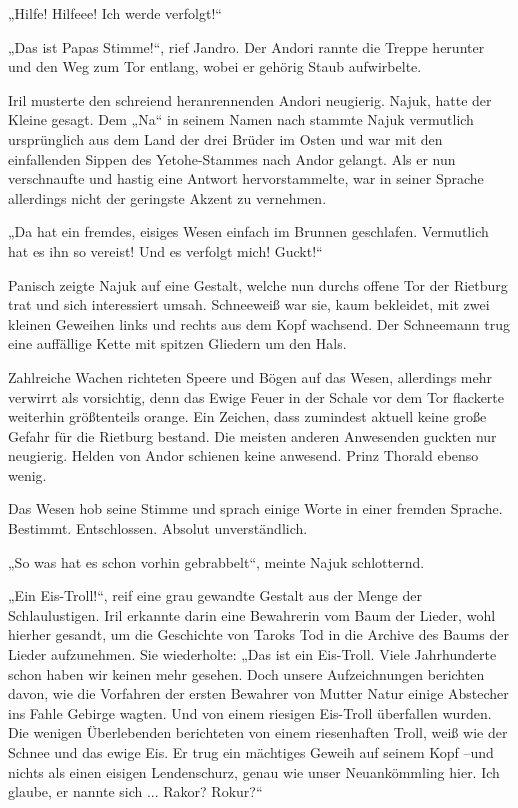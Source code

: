 „Hilfe! Hilfeee! Ich werde verfolgt!“

„Das ist Papas Stimme!“, rief Jandro. Der Andori rannte die Treppe herunter und den Weg zum Tor entlang, wobei er gehörig Staub aufwirbelte.

Iril musterte den schreiend heranrennenden Andori neugierig. Najuk, hatte der Kleine gesagt. Dem „Na“ in seinem Namen nach stammte Najuk vermutlich ursprünglich aus dem Land der drei Brüder im Osten und war mit den einfallenden Sippen des Yetohe-Stammes nach Andor gelangt. Als er nun verschnaufte und hastig eine Antwort hervorstammelte, war in seiner Sprache allerdings nicht der geringste Akzent zu vernehmen.

„Da hat ein fremdes, eisiges Wesen einfach im Brunnen geschlafen. Vermutlich hat es ihn so vereist! Und es verfolgt mich! Guckt!“

Panisch zeigte Najuk auf eine Gestalt, welche nun durchs offene Tor der Rietburg trat und sich interessiert umsah. Schneeweiß war sie, kaum bekleidet, mit zwei kleinen Geweihen links und rechts aus dem Kopf wachsend. Der Schneemann trug eine auffällige Kette mit spitzen Gliedern um den Hals.

Zahlreiche Wachen richteten Speere und Bögen auf das Wesen, allerdings mehr verwirrt als vorsichtig, denn das Ewige Feuer in der Schale vor dem Tor flackerte weiterhin größtenteils orange. Ein Zeichen, dass zumindest aktuell keine große Gefahr für die Rietburg bestand. Die meisten anderen Anwesenden guckten nur neugierig. Helden von Andor schienen keine anwesend. Prinz Thorald ebenso wenig.

Das Wesen hob seine Stimme und sprach einige Worte in einer fremden Sprache. Bestimmt. Entschlossen. Absolut unverständlich.

„So was hat es schon vorhin gebrabbelt“, meinte Najuk schlotternd.

„Ein Eis-Troll!“, reif eine grau gewandte Gestalt aus der Menge der Schlaulustigen. Iril erkannte darin eine Bewahrerin vom Baum der Lieder, wohl hierher gesandt, um die Geschichte von Taroks Tod in die Archive des Baums der Lieder aufzunehmen. Sie wiederholte: „Das ist ein Eis-Troll. Viele Jahrhunderte schon haben wir keinen mehr gesehen. Doch unsere Aufzeichnungen berichten davon, wie die Vorfahren der ersten Bewahrer von Mutter Natur einige Abstecher ins Fahle Gebirge wagten. Und von einem riesigen Eis-Troll überfallen wurden. Die wenigen Überlebenden berichteten von einem riesenhaften Troll, weiß wie der Schnee und das ewige Eis. Er trug ein mächtiges Geweih auf seinem Kopf –und nichts als einen eisigen Lendenschurz, genau wie unser Neuankömmling hier. Ich glaube, er nannte sich ... Rakor? Rokur?“


